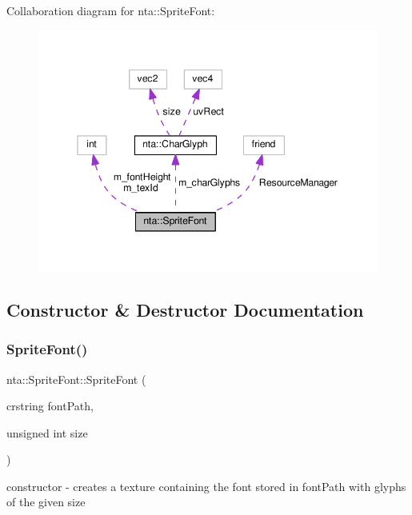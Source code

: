 Collaboration diagram for nta\+:\+:Sprite\+Font\+:
\nopagebreak
\begin{figure}[H]
\begin{center}
\leavevmode
\includegraphics[width=345pt]{da/dda/classnta_1_1SpriteFont__coll__graph}
\end{center}
\end{figure}


\subsection{Constructor \& Destructor Documentation}
\mbox{\label{classnta_1_1SpriteFont_a9dc96f31efd0830dcb476ea87534e358}} 
\subsubsection{\texorpdfstring{Sprite\+Font()}{SpriteFont()}}
{\footnotesize\ttfamily nta\+::\+Sprite\+Font\+::\+Sprite\+Font (\begin{DoxyParamCaption}\item[{crstring}]{font\+Path,  }\item[{unsigned int}]{size }\end{DoxyParamCaption})\hspace{0.3cm}{\ttfamily [private]}}



constructor -\/ creates a texture containing the font stored in font\+Path with glyphs of the given size 

